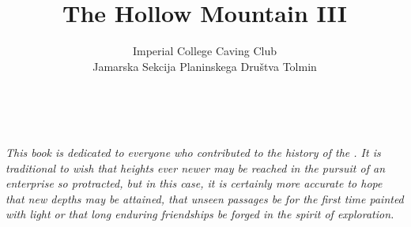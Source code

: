 \documentclass[symmetric, a4paper]{tufte-book}
\title{The Hollow Mountain III}
\author{Imperial College Caving Club \\ Jamarska Sekcija Planinskega Dru\v{s}tva Tolmin }
\begin{document}
\frontmatter 
\maketitle %

\justify

\cleardoublepage
~\vfill
\begin{doublespace}
\noindent\fontsize{12}{14}\selectfont\sffamily\slshape
\nohyphenation
This book is dedicated to everyone who contributed to the history of the . It is traditional to wish that heights ever newer may be reached in the pursuit of an enterprise so protracted, but in this case, it is certainly more accurate to hope that new depths may be attained,  that unseen passages  be for the first time painted with light  or that long enduring friendships be forged in the spirit of exploration. 

\end{doublespace}
\vfill
\vfill




\newpage



	\tableofcontents %
	\mainmatter
	

	
  	
	
 	
	
	
	
\backmatter
	
	    \clearpage
        	
	
	
	
	\label{Bibliography}
	
	
	
	\listofsurveys
	\listofmaps
   	 \printindex
   	
    

    
\end{document}
